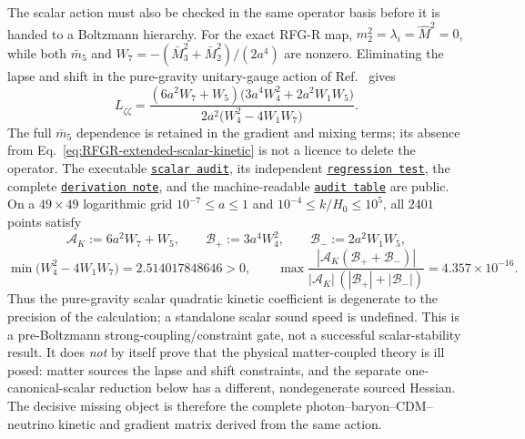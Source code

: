 \documentclass[11pt,a4paper]{article}
\newcommand{\RFGRepoURL}{https://github.com/MartinPetrasek123/MartinPetrasek123}
\newcommand{\RFGRepoNamed}[2]{\href{\RFGRepoURL/blob/main/r-universe-complete-chain/rfg-r-completion/r\_universe\_completion/#1}{\texttt{#2}}}
\begin{document}
The scalar action must also be checked in the same operator basis before it
is handed to a Boltzmann hierarchy.  For the exact RFG-R map,
\(m_2^2=\lambda_i=\hat M^2=0\), while both \(\bar m_5\) and
\(W_7=-(\bar M_3^2+\bar M_2^2)/(2a^4)\) are nonzero.  Eliminating the
lapse and shift in the pure-gravity unitary-gauge action of
Ref.~\cite{ExtendedEFTMap} gives
\begin{equation}
 L_{\dot\zeta\dot\zeta}=
 \frac{(6a^2W_7+W_5)\bigl(3a^4W_4^2+2a^2W_1W_5\bigr)}
 {2a^2\bigl(W_4^2-4W_1W_7\bigr)} .
 \label{eq:RFGR-extended-scalar-kinetic}
\end{equation}
The full \(\bar m_5\) dependence is retained in the gradient and mixing
terms; its absence from Eq.~\eqref{eq:RFGR-extended-scalar-kinetic} is not a
licence to delete the operator.  The executable
\RFGRepoNamed{scripts/extended\_eft\_scalar\_stability.py}{scalar audit},
its independent
\RFGRepoNamed{scripts/validate\_extended\_eft\_scalar\_stability.py}{regression test},
the complete \RFGRepoNamed{docs/extended\_eft\_scalar\_audit.md}{derivation note},
and the machine-readable
\RFGRepoNamed{generated/tables/extended\_eft\_scalar\_stability.csv}{audit table}
are public.  On a \(49\times49\) logarithmic grid
\(10^{-7}\leq a\leq1\) and \(10^{-4}\leq k/H_0\leq10^5\), all
\(2401\) points satisfy
\begin{equation}
 \mathcal A_K:=6a^2W_7+W_5,\qquad
 \mathcal B_+:=3a^4W_4^2,\qquad
 \mathcal B_-:=2a^2W_1W_5,
 \label{eq:RFGR-extended-scalar-audit-definitions}
\end{equation}
\begin{equation}
 \min\bigl(W_4^2-4W_1W_7\bigr)=2.514017848646>0,
 \qquad
 \max\frac{|\mathcal A_K(\mathcal B_++\mathcal B_-)|}
 {|\mathcal A_K|\,(|\mathcal B_+|+|\mathcal B_-|)}
 =4.357\times10^{-16}.
 \label{eq:RFGR-extended-scalar-audit}
\end{equation}
Thus the pure-gravity scalar quadratic kinetic coefficient is degenerate to
the precision of the calculation; a standalone scalar sound speed is
undefined.  This is a pre-Boltzmann strong-coupling/constraint gate, not a
successful scalar-stability result.  It does \emph{not} by itself prove that
the physical matter-coupled theory is ill posed: matter sources the lapse and
shift constraints, and the separate one-canonical-scalar reduction below has
a different, nondegenerate sourced Hessian.  The decisive missing object is
therefore the complete photon--baryon--CDM--neutrino kinetic and gradient
matrix derived from the same action.
\end{document}
